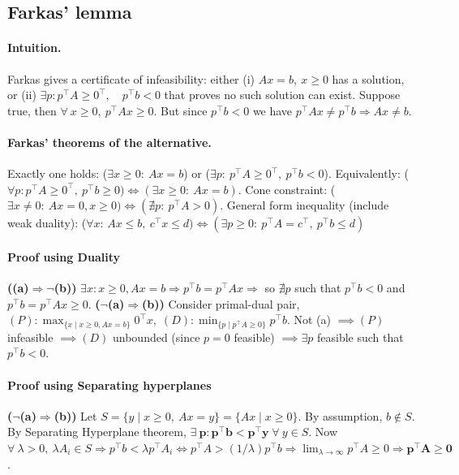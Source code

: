 \documentclass{article}
\begin{document}
\subsection{Farkas' lemma}
\paragraph{Intuition.} Farkas gives a certificate of infeasibility: either (i) $Ax=b,\ x\ge0$ has a solution, or (ii) $\exists p: p^\top A \ge 0^\top,\quad p^\top b < 0$ that proves no such solution can exist. Suppose true, then $\forall\ x \geq 0,\ p^\top Ax \geq 0$. But since $p^\top b < 0$ we have $p^\top Ax \neq p^\top b \Longrightarrow Ax \neq b$. 


\paragraph{Farkas' theorems of the alternative.} Exactly one holds: ($\exists x\ge0:\ Ax=b$) or ($\exists p:\ p^\top A \ge 0^\top,\ p^\top b < 0$). 
Equivalently: ($\forall p: p^\top A \ge 0^\top,\ p^\top b \ge 0) \iff (\exists x\ge0:\ Ax = b)$.
Cone constraint: ($\exists x \neq 0:\ Ax=0, x\geq 0) \iff (\nexists p:\ p^\top A > 0)$.
General form inequality (include weak duality): ($\forall x$: $Ax\le b,\ c^\top x \le d) \iff (\exists p\ge0:\ p^\top A = c^\top,\ p^\top b \le d)$ 


\paragraph{Proof using Duality} 
\textbf{((a)$\Rightarrow \neg$(b))} $\exists x: x\geq 0, Ax = b \Rightarrow p^\top b = p^\top Ax \Rightarrow$ so $\nexists p$ such that $p^\top b < 0$ and $p^\top b = p^\top Ax \geq 0$. \textbf{($\neg$(a)$\Rightarrow$(b))} Consider primal-dual pair, $(P):\max_{\{x\mid x\geq 0, Ax=b\}}0^\top x,\; (D): \min_{\{p\mid p^\top A\geq 0\}}p^\top b$. Not (a) $\implies (P)$ infeasible $\implies (D)$ unbounded (since $p = 0$ feasible) $\implies \exists p$ feasible such that $p^\top b < 0$. 



\paragraph{Proof using Separating hyperplanes}
\textbf{($\neg$(a)$\Rightarrow$(b))} Let $S = \{y \mid x\geq 0,\ Ax=y\} = \{Ax \mid x \geq 0\}$. By assumption, $b \notin S$. 
By Separating Hyperplane theorem, $\mathbf{\exists\ p: p^\top b < p^\top y} \; \forall\ y\in S$. 
Now $\forall\ \lambda > 0,\ \lambda A_i \in S \Longrightarrow p^\top b < \lambda p^\top A_i \iff p^\top A > (1/\lambda) p^\top b \Rightarrow \lim_{\lambda \to \infty} p^\top A \geq 0 \Longrightarrow \mathbf{p^\top A \geq 0}$. 
\end{document}
